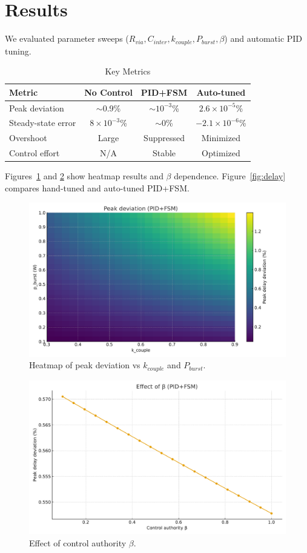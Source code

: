 \documentclass[conference]{IEEEtran}
\begin{document}
\section{Results}
We evaluated parameter sweeps ($R_{via}, C_{inter}, k_{couple}, P_{burst}, \beta$)
and automatic PID tuning.

\begin{table}[h]
\centering
\caption{Key Metrics}
\begin{tabular}{|l|c|c|c|}
\hline
Metric & No Control & PID+FSM & Auto-tuned \\
\hline
Peak deviation & $\sim$0.9\% & $\sim$$10^{-3}$\% & $2.6\times 10^{-5}$\% \\
Steady-state error & $8\times 10^{-3}$\% & $\sim$0\% & $-2.1\times 10^{-6}$\% \\
Overshoot & Large & Suppressed & Minimized \\
Control effort & N/A & Stable & Optimized \\
\hline
\end{tabular}
\end{table}

Figures~\ref{fig:heatmap} and \ref{fig:beta} show heatmap results
and $\beta$ dependence. Figure~\ref{fig:delay} compares hand-tuned and auto-tuned PID+FSM.

\begin{figure}[h]
\centering
\includegraphics[width=0.9\columnwidth]{figs/heatmap.pdf}
\caption{Heatmap of peak deviation vs $k_{couple}$ and $P_{burst}$.}
\label{fig:heatmap}
\end{figure}

\begin{figure}[h]
\centering
\includegraphics[width=0.9\columnwidth]{figs/beta_curve.pdf}
\caption{Effect of control authority $\beta$.}
\label{fig:beta}
\end{figure}
\end{document}
